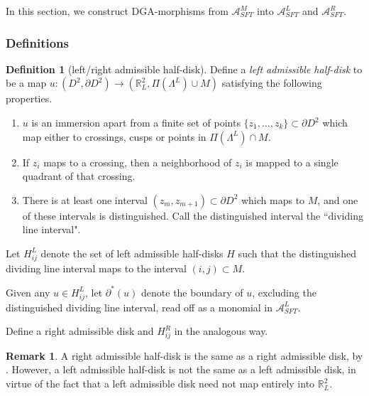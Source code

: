 \documentclass[a4paper,final, reqno]{amsart}
\theoremstyle{plain}
\theoremstyle{definition}
\newtheorem{Def}[Th]{Definition}
\newtheorem{Rem}[Th]{Remark}
\newcommand{\A}{\mathcal{A}}
\begin{document}
	In this section, we construct DGA-morphisms from $\A^M_{SFT}$ into $\A^L_{SFT}$ and $\A^R_{SFT}$.
	
	\subsubsection{Definitions}
	
	\begin{Def}[left/right admissible half-disk]
		Define a \emph{left admissible half-disk} to be a map $u:(D^2, \partial D^2) \to (\mathbb{R}^2_L, \Pi(\Lambda^L) \cup M)$ satisfying the following properties. 
		
		
		\begin{enumerate}
			\item $u$ is an immersion apart from a finite set of points $\{z_1, \dots, z_k\} \subset \partial D^2$ which map either to crossings, cusps or points in $\Pi(\Lambda^L) \cap M$.
			
			\item If $z_i$ maps to a crossing, then a neighborhood of $z_i$ is mapped to a single quadrant of that crossing.
			
			\item There is at least one interval $(z_m, z_{m+1}) \subset \partial D^2$ which maps to $M$, and one of these intervals is distinguished. Call the distinguished interval the ``dividing line interval". 
		\end{enumerate}
		
		Let $H_{ij}^L$ denote the set of left admissible half-disks $H$ such that the distinguished dividing line interval maps to the interval $(i,j) \subset M$.
		
		Given any $u \in H_{ij}^L$, let $\partial^*(u)$ denote the boundary of $u$, excluding the distinguished dividing line interval, read off as a monomial in $\A^L_{SFT}$.
		
		
		Define a right admissible disk and $H_{ij}^R$ in the analogous way.
		
	\end{Def}
	
	\begin{Rem} \label{rem:righthalfdisk}
		A right admissible half-disk is the same as a right admissible disk, by . However, a left admissible half-disk is not the same as a left admissible disk, in virtue of the fact that a left admissible disk need not map entirely into $\mathbb{R}^2_L$. 
	\end{Rem}
	
\end{document}
